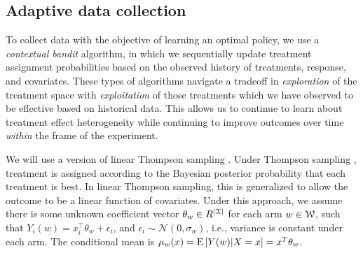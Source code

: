 \documentclass[letterpaper, 12pt, parskip=full,]{scrartcl}
\begin{document}


\subsection{Adaptive data collection}\label{adaptiveagent}

To collect data with the objective of learning an optimal policy, we use a \textit{contextual bandit} algorithm, in which we sequentially update treatment assignment probabilities based on the observed history of treatments, response, and covariates. These types of algorithms navigate a tradeoff in \textit{exploration} of the treatment space with \textit{exploitation} of those treatments which we have observed to be effective based on historical data. This allows us to continue to learn about treatment effect heterogeneity while continuing to improve outcomes over time \textit{within} the frame of the experiment. 

We will use a version of linear Thompson sampling \citep{agrawal2013thompson}. Under Thompson sampling \citep{thompson1933likelihood,thompson1935theory}, treatment is assigned according to the Bayesian posterior probability that each treatment is best. In linear Thompson sampling, this is generalized to allow the outcome to be a linear function of covariates. Under this approach, we assume there is some unknown coefficient vector $\theta_w\in R^{|{\EuScript X}|}$ for each arm $w \in {\EuScript W}$, such that $Y_i(w) = x_i^\top \theta_w + \epsilon_i$, and $\epsilon_i\sim \mathcal{N}(0, \sigma_w)$, i.e., variance is constant under each arm. The conditional mean is $\mu_w(x) = {\textrm E}\,[Y(w)|X=x] = x^T \theta_w$. 

\end{document}

